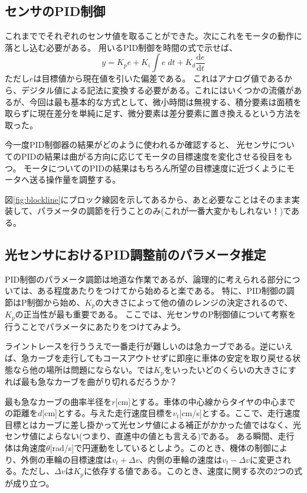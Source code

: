 \documentclass{ltjsreport}
\begin{document}
\subsection{センサのPID制御}\label{sec:SensorIntegration}
これまででそれぞれのセンサ値を取ることができた。次にこれをモータの動作に落とし込む必要がある。
用いるPID制御を時間の式で示せば、
\[
  y = K_p e + K_i \int e \; dt + K_d  \frac{\mathrm{d}e}{\mathrm{d}t}
\]
ただし$e$は目標値から現在値を引いた偏差である。
これはアナログ値であるから、デジタル値による記法に変換する必要がある。これにはいくつかの流儀があるが、今回は最も基本的な方式として、微小時間は無視する、積分要素は面積を取らずに現在差分を単純に足す、微分要素は差分要素に置き換えるという方法を取った。


今一度PID制御器の結果がどのように使われるか確認すると、
光センサについてのPIDの結果は曲がる方向に応じてモータの目標速度を変化させる役目をもつ。
モータについてのPIDの結果はもちろん所望の目標速度に近づくようにモータへ送る操作量を調整する。

図\ref{fig:blockline}にブロック線図を示してあるから、あと必要なことはそのまま実装して、パラメータの調節を行うことのみ(これが一番大変かもしれない！)である。

\subsection{光センサにおけるPID調整前のパラメータ推定}\label{sec:PIDestimate}
PID制御のパラメータ調節は地道な作業であるが、論理的に考えられる部分については、ある程度あたりをつけてから始めると楽である。
特に、PID制御の調節はP制御から始め、$K_p$の大きさによって他の値のレンジの決定されるので、$K_p$の正当性が最も重要である。
ここでは、光センサのP制御値について考察を行うことでパラメータにあたりをつけてみよう。

ライントレースを行ううえで一番走行が難しいのは急カーブである。逆にいえば、急カーブを走行してもコースアウトせずに即座に車体の安定を取り戻せる状態なら他の場所は問題にならない。では$K_p$をいったいどのくらいの大きさにすれば最も急なカーブを曲がり切れるだろうか？

最も急なカーブの曲率半径を$r$[cm]とする。車体の中心線からタイヤの中心までの距離を$d$[cm]とする。与えた走行速度目標を$v_t$[cm/s]とする。ここで、走行速度目標とはカーブに差し掛かって光センサ値による補正がかかった値ではなく、光センサ値によらない(つまり、直進中の値とも言える)である。
ある瞬間、走行体は角速度$\dot{\theta}$[rad/s]で円運動をしているとしよう。このとき、機体の制御により、外側の車輪の目標速度は$v_t + \Delta v$、内側の車輪の速度は$v_t - \Delta v$に変更される。ただし、$\Delta v $は$K_p$に依存する値である。このとき、速度に関する次の2つの式が成り立つ。
\end{document}
